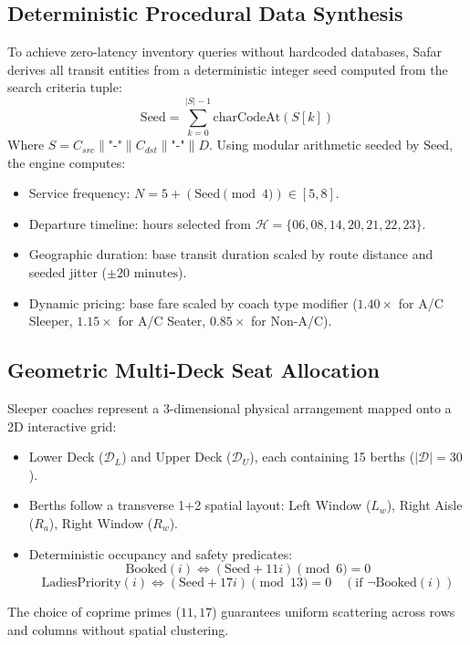 \documentclass[conference]{IEEEtran}
\begin{document}
\subsection{Deterministic Procedural Data Synthesis}
To achieve zero-latency inventory queries without hardcoded databases, Safar derives all transit entities from a deterministic integer seed computed from the search criteria tuple:
\begin{equation}
\text{Seed} = \sum_{k=0}^{|S|-1} \text{charCodeAt}(S[k])
\end{equation}
Where $S = C_{src} \parallel \text{"-"} \parallel C_{dst} \parallel \text{"-"} \parallel D$. Using modular arithmetic seeded by $\text{Seed}$, the engine computes:
\begin{itemize}
    \item Service frequency: $N = 5 + (\text{Seed} \pmod 4) \in [5, 8]$.
    \item Departure timeline: hours selected from $\mathcal{H} = \{06, 08, 14, 20, 21, 22, 23\}$.
    \item Geographic duration: base transit duration scaled by route distance and seeded jitter ($\pm 20 \text{ minutes}$).
    \item Dynamic pricing: base fare scaled by coach type modifier ($1.40\times$ for A/C Sleeper, $1.15\times$ for A/C Seater, $0.85\times$ for Non-A/C).
\end{itemize}

\subsection{Geometric Multi-Deck Seat Allocation}
Sleeper coaches represent a 3-dimensional physical arrangement mapped onto a 2D interactive grid:
\begin{itemize}
    \item Lower Deck ($\mathcal{D}_L$) and Upper Deck ($\mathcal{D}_U$), each containing 15 berths ($|\mathcal{D}| = 30$).
    \item Berths follow a transverse 1+2 spatial layout: Left Window ($L_w$), Right Aisle ($R_a$), Right Window ($R_w$).
    \item Deterministic occupancy and safety predicates:
    \begin{equation}
        \text{Booked}(i) \iff (\text{Seed} + 11i) \pmod 6 = 0
    \end{equation}
    \begin{equation}
        \text{LadiesPriority}(i) \iff (\text{Seed} + 17i) \pmod{13} = 0 \quad (\text{if } \neg\text{Booked}(i))
    \end{equation}
\end{itemize}
The choice of coprime primes ($11, 17$) guarantees uniform scattering across rows and columns without spatial clustering.
\end{document}
